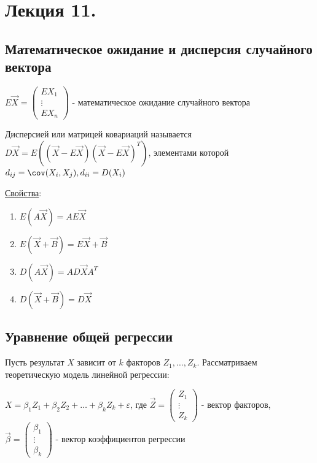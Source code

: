 \documentclass[12pt]{article}
\begin{document}
\section{Лекция 11.}

\subsection{Математическое ожидание и дисперсия случайного вектора}

\Def $E \vec X = \begin{pmatrix}E X_1 \\ \vdots \\ E X_n \end{pmatrix}$ - математическое ожидание случайного вектора

\Def Дисперсией или матрицей ковариаций называется $D \vec X = E ((\vec X - E \vec X) (\vec X - E \vec X)^T )$, 
элементами которой $d_{ij} = \cov (X_i, X_j), d_{ii} = D(X_i)$

\underline{Свойства}:

\begin{enumerate}
    \item $E(A \vec X) = A E \vec X$
    \item $E(\vec X + \vec B) = E \vec X + \vec B$
    \item $D(A \vec X) = A D \vec X A^T$
    \item $D(\vec X + \vec B) = D \vec X$
\end{enumerate}

\subsection{Уравнение общей регрессии}

\hypertarget{general_regression}{}

Пусть результат $X$ зависит от $k$ факторов $Z_1, \dots, Z_k$. Рассматриваем теоретическую модель линейной регрессии:

$X = \beta_1 Z_1 + \beta_2 Z_2 + \dots + \beta_k Z_k + \varepsilon$, где $\vec Z = \begin{pmatrix}Z_1 \\ \vdots \\ Z_k \end{pmatrix}$ - вектор факторов, $\vec \beta = \begin{pmatrix}\beta_1 \\ \vdots \\ \beta_k \end{pmatrix}$ - вектор коэффициентов регрессии
\end{document}
